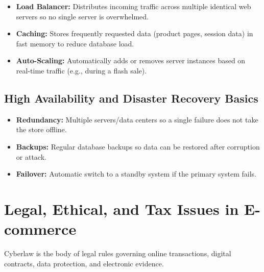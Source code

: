 \documentclass[11pt,a4paper]{article}
\begin{document}
\begin{itemize}[leftmargin=*]
  \item \textbf{Load Balancer:} Distributes incoming traffic across multiple identical web servers so no single server is overwhelmed.
  \item \textbf{Caching:} Stores frequently requested data (product pages, session data) in fast memory to reduce database load.
  \item \textbf{Auto-Scaling:} Automatically adds or removes server instances based on real-time traffic (e.g., during a flash sale).
\end{itemize}

\subsection{High Availability and Disaster Recovery Basics}
\begin{conceptbox}
\begin{itemize}[leftmargin=*]
  \item \textbf{Redundancy:} Multiple servers/data centers so a single failure does not take the store offline.
  \item \textbf{Backups:} Regular database backups so data can be restored after corruption or attack.
  \item \textbf{Failover:} Automatic switch to a standby system if the primary system fails.
\end{itemize}
\end{conceptbox}

\section{Legal, Ethical, and Tax Issues in E-commerce}

\begin{definitionbox}[Cyberlaw]
Cyberlaw is the body of legal rules governing online transactions, digital contracts, data protection, and electronic evidence.
\end{definitionbox}
\end{document}
